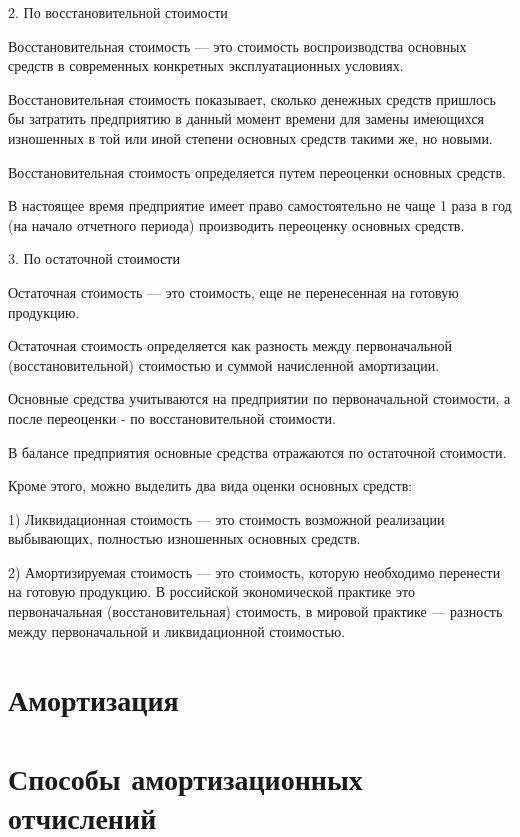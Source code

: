 2. По восстановительной стоимости

Восстановительная стоимость --- это стоимость воспроизводства основных средств в
современных конкретных эксплуатационных условиях.

Восстановительная стоимость показывает, сколько денежных средств пришлось бы
затратить предприятию в данный момент времени для замены имеющихся изношенных в
той или иной степени основных средств такими же, но новыми.

Восстановительная стоимость определяется путем переоценки основных средств.

В настоящее время предприятие имеет право самостоятельно не чаще 1 раза в год
(на начало отчетного периода) производить переоценку основных средств.

3. По остаточной стоимости

Остаточная стоимость --- это стоимость, еще не перенесенная на готовую
продукцию.

Остаточная стоимость определяется как разность между первоначальной
(восстановительной) стоимостью и суммой начисленной амортизации.

Основные средства учитываются на предприятии по первоначальной стоимости, а
после переоценки - по восстановительной стоимости.

В балансе предприятия основные средства отражаются по остаточной стоимости.

Кроме этого, можно выделить два вида оценки основных средств:

1) Ликвидационная стоимость --- это стоимость возможной реализации выбывающих,
полностью изношенных основных средств.

2) Амортизируемая стоимость --- это стоимость, которую необходимо перенести на
готовую продукцию. В российской экономической практике это первоначальная
(восстановительная) стоимость, в мировой практике --- разность между
первоначальной и ликвидационной стоимостью.

\section{Амортизация}

\section{Способы амортизационных отчислений}
